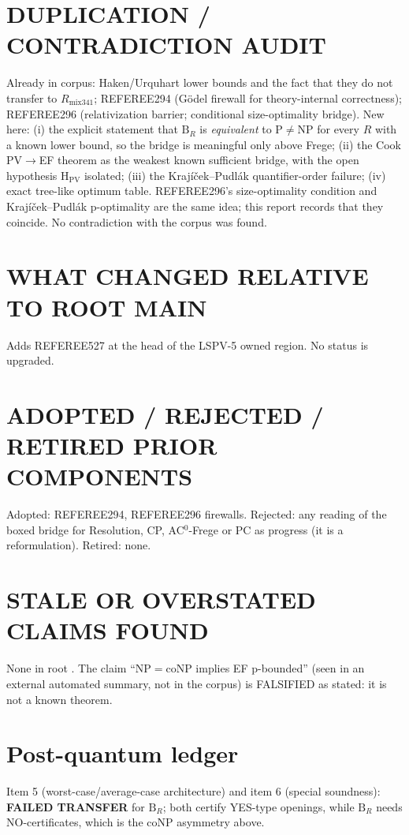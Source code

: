 \documentclass[11pt]{article}
\begin{document}
\section*{DUPLICATION / CONTRADICTION AUDIT}
Already in corpus: Haken/Urquhart lower bounds and the fact that they do not transfer to
$R_{\mathrm{mix341}}$; REFEREE294 (Gödel firewall for theory-internal correctness);
REFEREE296 (relativization barrier; conditional size-optimality bridge).
New here: (i) the explicit statement that $\mathrm B_R$ is \emph{equivalent} to P$\neq$NP for
every $R$ with a known lower bound, so the bridge is meaningful only above Frege;
(ii) the Cook PV$\to$EF theorem as the weakest known sufficient bridge, with the open
hypothesis H$_{\mathrm{PV}}$ isolated; (iii) the Krajíček--Pudlák quantifier-order failure;
(iv) exact tree-like optimum table. REFEREE296's size-optimality condition and
Krajíček--Pudlák p-optimality are the same idea; this report records that they coincide.
No contradiction with the corpus was found.

\section*{WHAT CHANGED RELATIVE TO ROOT MAIN}
Adds REFEREE527 at the head of the LSPV-5 owned region. No status is upgraded.

\section*{ADOPTED / REJECTED / RETIRED PRIOR COMPONENTS}
Adopted: REFEREE294, REFEREE296 firewalls. Rejected: any reading of the boxed bridge for
Resolution, CP, AC$^0$-Frege or PC as progress (it is a reformulation).
Retired: none.

\section*{STALE OR OVERSTATED CLAIMS FOUND}
None in root . The claim ``NP$=$coNP implies EF p-bounded'' (seen in an
external automated summary, not in the corpus) is FALSIFIED as stated: it is not a known
theorem.

\section*{Post-quantum ledger}
Item 5 (worst-case/average-case architecture) and item 6 (special soundness):
\textbf{FAILED TRANSFER} for $\mathrm B_R$; both certify YES-type openings, while
$\mathrm B_R$ needs NO-certificates, which is the coNP asymmetry above.
\end{document}
